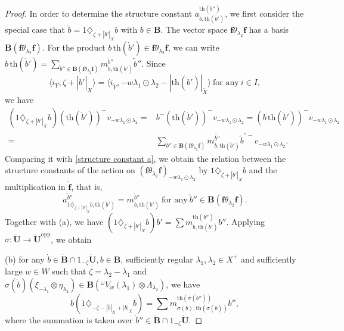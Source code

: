 \documentclass[10pt,a4paper]{amsart}
\begin{document}
\begin{proof}
In order to determine the structure constant $a_{\dot{b},\mathrm{th}(\dot{b}')}^{\mathrm{th}(\dot{b}'')}$, we first consider the special case that $\dot{b}=1\diamondsuit_{\zeta+|\dot{b}'|_X}b$ with $b\in \mathbf{B}$. The vector space $\mathbf{f}\theta_{\lambda_2}\mathbf{f}$ has a basis $\mathbf{B}(\mathbf{f}\theta_{\lambda_2}\mathbf{f})$. For the product $b\,\mathrm{th}(\dot{b}')\in \mathbf{f}\theta_{\lambda_2}\mathbf{f}$, we can write $b\,\mathrm{th}(\dot{b}')=\sum_{\tilde{b}''\in \mathbf{B}(\mathbf{f}\theta_{\lambda_2}\mathbf{f})}m_{b,\mathrm{th}(\dot{b}')}^{\tilde{b}''}\tilde{b}''$. Since
\begin{equation}\label{weight relation}
\langle i_Y,\zeta+|\dot{b}'|_X\rangle=\langle i_{\tilde{Y}},-w\lambda_1\odot\lambda_2-|\mathrm{th}(\dot{b}')|_{\tilde{X}}\rangle\ \textrm{for any}\ i\in I,   
\end{equation}
we have 
\begin{align*}
(1\diamondsuit_{\zeta+|\dot{b}'|_X}b)(\mathrm{th}(\dot{b}'))^-v_{-w\lambda_1\odot\lambda_2}=&b^-(\mathrm{th}(\dot{b}'))^-v_{-w\lambda_1\odot\lambda_2}
=(b\,\mathrm{th}(\dot{b}'))^-v_{-w\lambda_1\odot\lambda_2}\\
=&\sum_{\tilde{b}''\in \mathbf{B}(\mathbf{f}\theta_{\lambda_2}\mathbf{f})}m_{b,\mathrm{th}(\dot{b}')}^{\tilde{b''}}\tilde{b}^{''-}v_{-w\lambda_1\odot\lambda_2}.
\end{align*}
Comparing it with \eqref{structure constant a}, we obtain the relation between the structure constants of the action on $(\mathbf{f}\theta_{\lambda_2}\mathbf{f})_{-w\lambda_1\odot\lambda_2}$ by $1\diamondsuit_{\zeta+|\dot{b}'|_X}b$ and the multiplication in $\tilde{\mathbf{f}}$, that is, 
$$a_{1\diamondsuit_{\zeta+|\dot{b}'|_X}b,\mathrm{th}(\dot{b}')}^{\tilde{b}''}=m_{b,\mathrm{th}(\dot{b}')}^{\tilde{b}''}\ \textrm{for any}\ \tilde{b}''\in \mathbf{B}(\mathbf{f}\theta_{\lambda_2}\mathbf{f}).$$ 
Together with (a), we have $(1\diamondsuit_{\zeta+|\dot{b}'|_X}b)\dot{b}'=\sum m_{b,\mathrm{th}(\dot{b}')}^{\mathrm{th}(\dot{b}'')}\dot{b}''$. Applying $\sigma:\dot{\mathbf{U}}\rightarrow \dot{\mathbf{U}}^{\mathrm{opp}}$, we obtain 

(b) for any $\dot{b}\in \dot{\mathbf{B}}\cap 1_{-\zeta}\dot{\mathbf{U}},b\in \mathbf{B}$, sufficiently regular $\lambda_1,\lambda_2\in X^+$ and sufficiently large $w\in W$ such that $\zeta=\lambda_2-\lambda_1$ and $\sigma(\dot{b})(\xi_{-\lambda_1}\otimes \eta_{\lambda_2})\in \mathbf{B}({^{\omega}V_w(\lambda_1)\otimes \Lambda_{\lambda_2}})$, we have
$$\dot{b}(1\diamondsuit_{-\zeta-|\dot{b}|_X+|b|_X}b)=\sum m_{\sigma(b),\mathrm{th}(\sigma(\dot{b}))}^{\mathrm{th}(\sigma(\dot{b}''))}\dot{b}'',$$
where the summation is taken over $\dot{b}''\in \dot{\mathbf{B}}\cap 1_{-\zeta}\dot{\mathbf{U}}$.


\end{proof}
\end{document}
